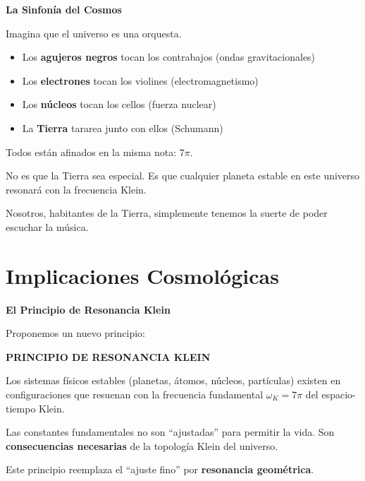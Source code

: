 \begin{analogiabox}
\textbf{La Sinfonía del Cosmos}

Imagina que el universo es una orquesta.

\begin{itemize}
    \item Los \textbf{agujeros negros} tocan los contrabajos (ondas gravitacionales)
    \item Los \textbf{electrones} tocan los violines (electromagnetismo)
    \item Los \textbf{núcleos} tocan los cellos (fuerza nuclear)
    \item La \textbf{Tierra} tararea junto con ellos (Schumann)
\end{itemize}

Todos están afinados en la misma nota: $7\pi$.

No es que la Tierra sea especial.
Es que cualquier planeta estable en este universo
resonará con la frecuencia Klein.

Nosotros, habitantes de la Tierra, simplemente tenemos
la suerte de poder escuchar la música.
\end{analogiabox}


\section{Implicaciones Cosmológicas}

\begin{nivelmatematico}
\textbf{El Principio de Resonancia Klein}

Proponemos un nuevo principio:

\begin{tcolorbox}[colback=white, colframe=kleinblue, boxrule=2pt]
\textbf{PRINCIPIO DE RESONANCIA KLEIN}

Los sistemas físicos estables (planetas, átomos, núcleos, partículas)
existen en configuraciones que resuenan con la frecuencia fundamental
$\omega_K = 7\pi$ del espacio-tiempo Klein.

Las constantes fundamentales no son ``ajustadas'' para permitir la vida.
Son \textbf{consecuencias necesarias} de la topología Klein del universo.
\end{tcolorbox}

Este principio reemplaza el ``ajuste fino'' por \textbf{resonancia geométrica}.
\end{nivelmatematico}

